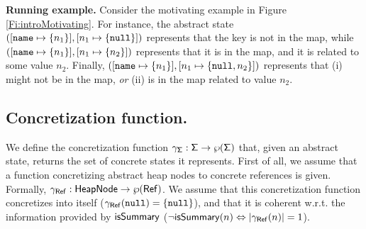 \noindent \textbf{Running example.} 
Consider the motivating example in Figure \ref{Fi:introMotivating}. For instance, the abstract state $([\mathtt{name} \mapsto \{n_1\}], [n_1 \mapsto \{\mathtt{null}\}])$ represents that the key  is not in the map, while $([\mathtt{name} \mapsto \{n_1\}], [n_1 \mapsto \{n_2\}])$ represents that it is in the map, and it is related to some value $n_2$. Finally, $([\mathtt{name} \mapsto \{n_1\}], [n_1 \mapsto \{\mathtt{null}, n_2\}])$ represents that  (i) might not be in the map, \emph{or} (ii) is in the map related to value $n_2$.

\subsection{Concretization function.}
We define the concretization function $\gamma_{\mathsf{\Sigma}} : \mathsf{\Sigma} \to \wp(\mathsf{\Sigma})$ that, given an abstract state, returns the set of concrete states it represents. First of all, we assume that a function concretizing abstract heap nodes to concrete references is given. Formally, $\gamma_{\mathsf{Ref}} : \mathsf{HeapNode} \to \wp(\mathsf{Ref})$. We assume that this concretization function concretizes  into itself ($\gamma_{\mathsf{Ref}}(\mathtt{null})=\{\mathtt{null}\}$), and that it is coherent w.r.t. the information provided by $\mathsf{isSummary}$ ($\neg \mathsf{isSummary}(n) \Leftrightarrow |\gamma_{\mathsf{Ref}}(n)|=1$).

